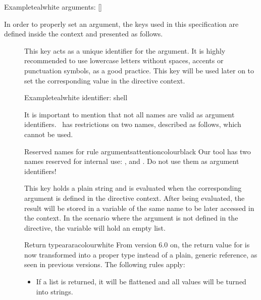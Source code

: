 \begin{description}
\begin{codebox}{Example}{teal}{\icnote}{white}
arguments: []
\end{codebox}

In order to properly set an argument, the keys used in this specification are defined inside the  context and presented as follows.

\begin{description}
\item[] This key acts as a unique identifier for the argument. It is highly recommended to use lowercase letters without spaces, accents or punctuation symbols, as a good practice. This key will be used later on to set the corresponding value in the directive context.

\begin{codebox}{Example}{teal}{\icnote}{white}
identifier: shell
\end{codebox}

It is important to mention that not all names are valid as argument identifiers. \arara\ has restrictions on two names, described as follows, which cannot be used.

\begin{messagebox}{Reserved names for rule arguments}{attentioncolour}{\icattention}{black}
Our tool has two names reserved for internal use: , and . Do not use them as argument identifiers!
\end{messagebox}

\item[] This key holds a plain string and is evaluated when the corresponding argument is defined in the directive context.  After being evaluated, the result will be stored in a variable of the same name to be later accessed in the  context. In the scenario where the argument is not defined in the directive, the variable will hold an empty list.

\begin{messagebox}{Return type}{araracolour}{\icinfo}{white}
From version 6.0 on, the return value for  is now transformed into a proper  type instead of a plain, generic  reference, as seen in previous versions. The following rules apply:

\begin{itemize}[label={--}]
\item If a list is returned, it will be flattened and all values will be turned into strings.


\end{itemize}
\end{messagebox}
\end{description}
\end{description}
